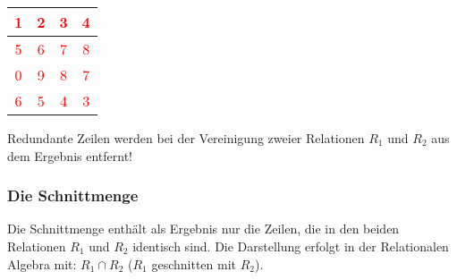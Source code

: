 \begin{center}
\begin{small}
\begin{minipage}[b]{.2\linewidth}
\begin{center}
\begin{supertabular}{|c|c|c|c|}
                \end{supertabular}
            \end{center}
        \end{minipage}
        \hfil
        \begin{minipage}[b]{.2\linewidth}
            \begin{center}
                \tabletail{
                    \hline
                }
                \tablelasttail{
                    \hline
                }
                \begin{supertabular}{|c|c|c|c|}
                    \textcolor{red}{1} & \textcolor{red}{2} & \textcolor{red}{3} & \textcolor{red}{4} \\
                    \hline
                    \textcolor{red}{5} & \textcolor{red}{6} & \textcolor{red}{7} & \textcolor{red}{8} \\
                    \hline
                    \textcolor{red}{0} & \textcolor{red}{9} & \textcolor{red}{8} & \textcolor{red}{7} \\
                    \hline
                    \textcolor{red}{6} & \textcolor{red}{5} & \textcolor{red}{4} & \textcolor{red}{3} \\
                \end{supertabular}
            \end{center}
        \end{minipage}
    \end{small}
\end{center}
\begin{merke}
    Redundante Zeilen werden bei der Vereinigung zweier Relationen $R_1$ und $R_2$ aus dem Ergebnis entfernt!
\end{merke}
\subsubsection{Die Schnittmenge}
Die Schnittmenge enthält als Ergebnis nur die Zeilen, die in den beiden Relationen $R_1$ und $R_2$ identisch sind. Die Darstellung erfolgt in der Relationalen Algebra mit: $R_1\cap R_2$ ($R_1$ geschnitten mit $R_2$).

